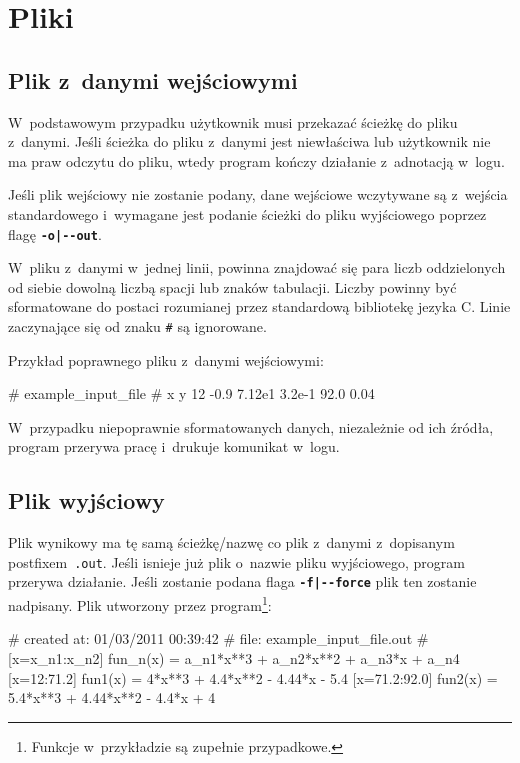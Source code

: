 \documentclass[10pt,a4paper]{article}
\newcommand{\prog}[1]{\texttt{#1}}
\newcommand{\flag}[1]{\textbf{\prog{#1}}}
\begin{document}
\section{Pliki}
\label{sec:pliki}

\subsection{Plik z~danymi wejściowymi}
\label{sec:plik_wejsciowy}

W~podstawowym przypadku użytkownik musi przekazać ścieżkę do pliku z~danymi.
Jeśli ścieżka do pliku z~danymi jest niewłaściwa lub użytkownik nie ma praw
odczytu do pliku, wtedy program kończy działanie z~adnotacją w~logu.

Jeśli plik wejściowy nie zostanie podany, dane wejściowe wczytywane są
z~wejścia standardowego i~wymagane jest podanie ścieżki do pliku wyjściowego
poprzez flagę \flag{-o|-\--out}.

W~pliku z~danymi w~jednej linii, powinna znajdować się para liczb oddzielonych
od siebie dowolną liczbą spacji lub znaków tabulacji. Liczby powinny być
sformatowane do postaci rozumianej przez standardową bibliotekę jezyka C.
Linie zaczynające się od znaku \prog{\#} są ignorowane.

Przykład poprawnego pliku z~danymi wejściowymi:
\vspace{-12pt}
\begin{SmallVerbatim}
    # example_input_file
    # x y
    12     -0.9
    7.12e1  3.2e-1  
    92.0    0.04
\end{SmallVerbatim}

W~przypadku niepoprawnie sformatowanych danych, niezależnie od ich źródła,
program przerywa pracę i~drukuje komunikat w~logu.

\subsection{Plik wyjściowy}
\label{sec:plik_wyjsciowy}

Plik wynikowy ma tę samą ścieżkę/nazwę co plik z~danymi z~dopisanym
postfixem~\prog{.out}. Jeśli isnieje już plik o~nazwie pliku wyjściowego,
program przerywa działanie. Jeśli zostanie podana flaga \flag{-f|-\--force}
plik ten zostanie nadpisany. Plik utworzony przez program\footnote{Funkcje
w~przykładzie są zupełnie przypadkowe.}:
\vspace{-12pt}
\begin{SmallVerbatim}
    # created at: 01/03/2011 00:39:42
    #       file: example_input_file.out
    # [x=x_{n1}:x_{n2}] fun_n(x) = a_{n1}*x**3 + a_{n2}*x**2 + a_{n3}*x + a_{n4}
    [x=12:71.2] fun1(x) = 4*x**3 + 4.4*x**2 - 4.44*x - 5.4
    [x=71.2:92.0] fun2(x) = 5.4*x**3 + 4.44*x**2 - 4.4*x + 4
\end{SmallVerbatim}
\end{document}
